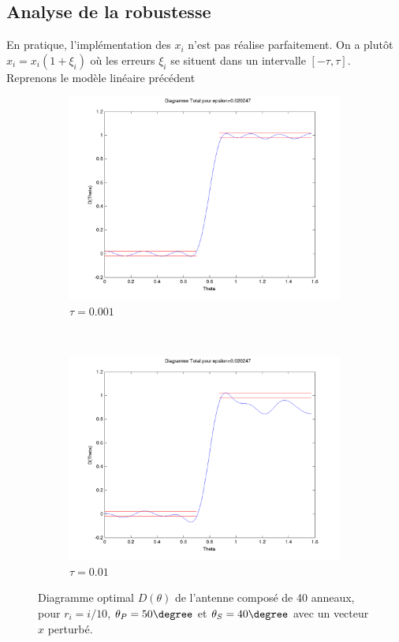 \subsection{Analyse de la robustesse}
En pratique, l'implémentation des $x_i$ n'est pas réalise parfaitement. On a plutôt $\hat{x}_i = x_i(1+\xi_i)$ où les erreurs $\xi_i$ se situent dans un intervalle $[-\tau,\tau]$.\\
Reprenons le modèle linéaire précédent 

\begin{figure}[h!]
  \centering
  \begin{subfigure}[b]{0.45\textwidth}
  \includegraphics[width=\textwidth]{D-ModLin-Robust001.png}
  \caption{$\tau = 0.001$}
  \label{fig:D-ModLin-Robust001}
  \end{subfigure}%
  ~ 
  \begin{subfigure}[b]{0.45\textwidth}
  \includegraphics[width=\textwidth]{D-ModLin-Robust01.png}
  \caption{$\tau=0.01$}
  \label{fig:D-ModLin-Robust01}
  \end{subfigure}
  \caption{Diagramme optimal $D(\theta)$ de l'antenne composé de 40 anneaux, pour $r_i=i/10$, $\theta_P=50 \degree$ et $\theta_S=40 \degree$ avec un vecteur $x$ perturbé.}
  \end{figure}










